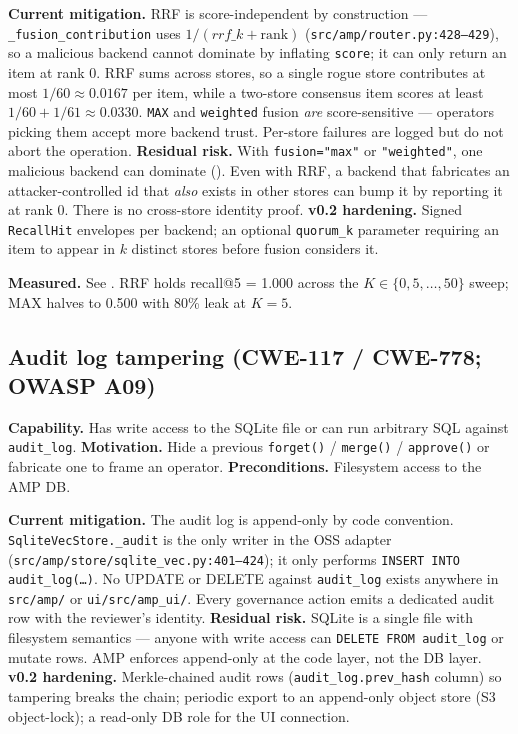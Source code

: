 \documentclass[11pt,letterpaper,twocolumn]{article}
\begin{document}
\textbf{Current mitigation.} RRF is score-independent by construction --- \texttt{\_fusion\_contribution} uses $1 / (\mathit{rrf\_k} + \mathrm{rank})$ (\texttt{src/amp/router.py:428--429}), so a malicious backend cannot dominate by inflating \texttt{score}; it can only return an item at rank 0. RRF sums across stores, so a single rogue store contributes at most $1/60 \approx 0.0167$ per item, while a two-store consensus item scores at least $1/60 + 1/61 \approx 0.0330$. \texttt{MAX} and \texttt{weighted} fusion \emph{are} score-sensitive --- operators picking them accept more backend trust. Per-store failures are logged but do not abort the operation. \textbf{Residual risk.} With \texttt{fusion="max"} or \texttt{"weighted"}, one malicious backend can dominate (). Even with RRF, a backend that fabricates an attacker-controlled id that \emph{also} exists in other stores can bump it by reporting it at rank 0. There is no cross-store identity proof. \textbf{v0.2 hardening.} Signed \texttt{RecallHit} envelopes per backend; an optional \texttt{quorum\_k} parameter requiring an item to appear in $k$ distinct stores before fusion considers it.

\textbf{Measured.} See . RRF holds recall@5 = 1.000 across the $K \in \{0,5,\dots,50\}$ sweep; MAX halves to 0.500 with 80\% leak at $K=5$.

\subsection{Audit log tampering (CWE-117 / CWE-778; OWASP A09)}
\label{sec:threats-audit}

\textbf{Capability.} Has write access to the SQLite file or can run arbitrary SQL against \texttt{audit\_log}. \textbf{Motivation.} Hide a previous \texttt{forget()} / \texttt{merge()} / \texttt{approve()} or fabricate one to frame an operator. \textbf{Preconditions.} Filesystem access to the AMP DB.

\textbf{Current mitigation.} The audit log is append-only by code convention. \texttt{SqliteVecStore.\_audit} is the only writer in the OSS adapter (\texttt{src/amp/store/sqlite\_vec.py:401--424}); it only performs \texttt{INSERT INTO audit\_log(\ldots)}. No UPDATE or DELETE against \texttt{audit\_log} exists anywhere in \texttt{src/amp/} or \texttt{ui/src/amp\_ui/}. Every governance action emits a dedicated audit row with the reviewer's identity. \textbf{Residual risk.} SQLite is a single file with filesystem semantics --- anyone with write access can \texttt{DELETE FROM audit\_log} or mutate rows. AMP enforces append-only at the code layer, not the DB layer. \textbf{v0.2 hardening.} Merkle-chained audit rows (\texttt{audit\_log.prev\_hash} column) so tampering breaks the chain; periodic export to an append-only object store (S3 object-lock); a read-only DB role for the UI connection.
\end{document}
